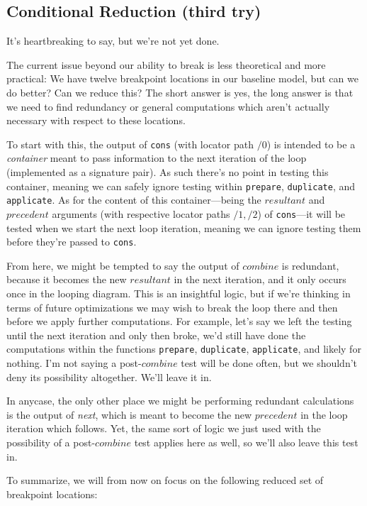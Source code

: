\documentclass[twoside]{article}
\begin{document}
\subsection*{Conditional Reduction (third try)}

It's heartbreaking to say, but we're not yet done.

The current issue beyond our ability to break is less theoretical and more practical: We have twelve breakpoint locations
in our baseline model, but can we do better? Can we reduce this? The short answer is yes, the long answer is that we need
to find redundancy or general computations which aren't actually necessary with respect to these locations.

To start with this, the output of \texttt{cons} (with locator path $ /0 $) is intended to be a \emph{container} meant to pass
information to the next iteration of the loop (implemented as a signature pair). As such there's no point in testing this
container, meaning we can safely ignore testing within \texttt{prepare}, \texttt{duplicate}, and \texttt{applicate}. As for
the content of this container---being the $ resultant $ and $ precedent $ arguments (with respective locator paths $ /1, /2 $)
of \texttt{cons}---it will be tested when we start the next loop iteration, meaning we can ignore testing them before they're
passed to \texttt{cons}.

From here, we might be tempted to say the output of $ combine $ is redundant, because it becomes the new $ resultant $
in the next iteration, and it only occurs once in the looping diagram. This is an insightful logic, but if we're thinking
in terms of future optimizations we may wish to break the loop there and then before we apply further computations. For
example, let's say we left the testing until the next iteration and only then broke, we'd still have done the computations
within the functions \texttt{prepare}, \texttt{duplicate}, \texttt{applicate}, and likely for nothing. I'm not saying
a post-$combine$ test will be done often, but we shouldn't deny its possibility altogether. We'll leave it in.

In anycase, the only other place we might be performing redundant calculations is the output of \emph{next}, which is
meant to become the new $ precedent $ in the loop iteration which follows. Yet, the same sort of logic we just used with
the possibility of a post-$combine$ test applies here as well, so we'll also leave this test in.

To summarize, we will from now on focus on the following reduced set of breakpoint locations:
\end{document}
